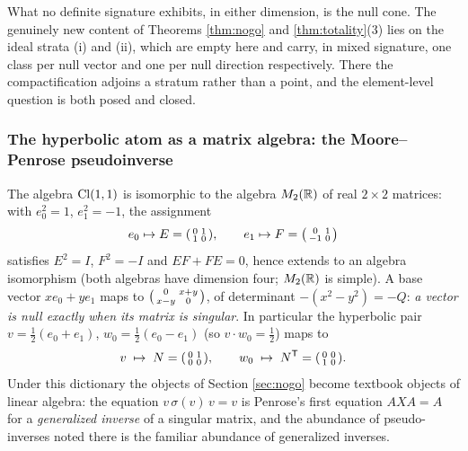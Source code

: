 What no definite signature exhibits, in either dimension, is the null cone. The genuinely new content of Theorems \ref{thm:nogo} and \ref{thm:totality}(3) lies on the ideal strata (i) and (ii), which are empty here and carry, in mixed signature, one class per null vector and one per null direction respectively. There the compactification adjoins a stratum rather than a point, and the element-level question is both posed and closed.

\subsubsection{The hyperbolic atom as a matrix algebra: the Moore--Penrose pseudoinverse}\label{subsec:mp}

The algebra $\mathrm{Cl}(1,1)$ is isomorphic to the algebra $M_2(\mathbb{R})$ of real $2 \times 2$ matrices: with $e_0^2 = 1$, $e_1^2 = -1$, the assignment
\[
e_0 \mapsto E = \begin{psmallmatrix} 0 & 1 \\ 1 & 0 \end{psmallmatrix}, \qquad
e_1 \mapsto F = \begin{psmallmatrix} 0 & 1 \\ -1 & 0 \end{psmallmatrix}
\]
satisfies $E^2 = I$, $F^2 = -I$ and $EF + FE = 0$, hence extends to an algebra isomorphism (both algebras have dimension four; $M_2(\mathbb{R})$ is simple). A base vector $x e_0 + y e_1$ maps to $\begin{psmallmatrix} 0 & x+y \\ x-y & 0 \end{psmallmatrix}$, of determinant $-(x^2 - y^2) = -Q$: \emph{a vector is null exactly when its matrix is singular}. In particular the hyperbolic pair $v = \tfrac12(e_0 + e_1)$, $w_0 = \tfrac12(e_0 - e_1)$ (so $v \cdot w_0 = \tfrac12$) maps to
\[
v \;\mapsto\; N = \begin{psmallmatrix} 0 & 1 \\ 0 & 0 \end{psmallmatrix}, \qquad
w_0 \;\mapsto\; N^{\mathsf T} = \begin{psmallmatrix} 0 & 0 \\ 1 & 0 \end{psmallmatrix}.
\]
Under this dictionary the objects of Section \ref{sec:nogo} become textbook objects of linear algebra: the equation $v\,\sigma(v)\,v = v$ is Penrose's first equation $AXA = A$ for a \emph{generalized inverse} of a singular matrix, and the abundance of pseudo-inverses noted there is the familiar abundance of generalized inverses.

